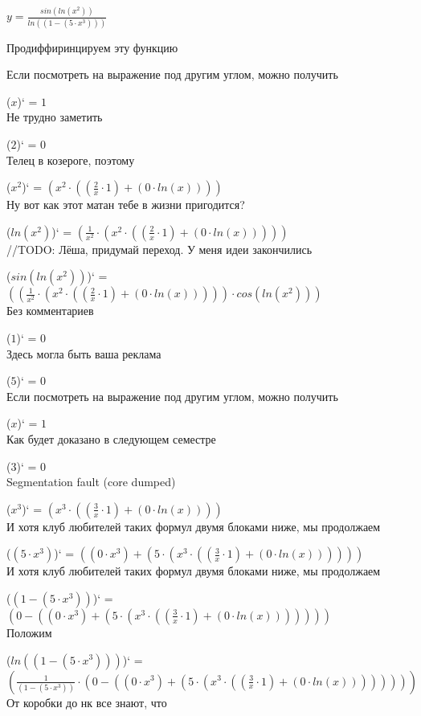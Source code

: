 \documentclass[12pt,a4paper,fleqn]{article}
\begin{document}
$y = $$\frac{sin(ln(x^{2}))}{ln((1 - (5 \cdot x^{3})))}$

 Продиффиринцируем эту функцию

Если посмотреть на выражение под другим углом, можно получить

($x$)` = $1$\\
Не трудно заметить

($2$)` = $0$\\
Телец в козероге, поэтому

($x^{2}$)` = $(x^{2} \cdot ((\frac{2}{x} \cdot 1) + (0 \cdot ln(x))))$\\
Ну вот как этот матан тебе в жизни пригодится?

($ln(x^{2})$)` = $(\frac{1}{x^{2}} \cdot (x^{2} \cdot ((\frac{2}{x} \cdot 1) + (0 \cdot ln(x)))))$\\
//TODO: Лёша, придумай переход. У меня идеи закончились

($sin(ln(x^{2}))$)` = $((\frac{1}{x^{2}} \cdot (x^{2} \cdot ((\frac{2}{x} \cdot 1) + (0 \cdot ln(x))))) \cdot cos(ln(x^{2})))$\\
Без комментариев

($1$)` = $0$\\
Здесь могла быть ваша реклама

($5$)` = $0$\\
Если посмотреть на выражение под другим углом, можно получить

($x$)` = $1$\\
Как будет доказано в следующем семестре

($3$)` = $0$\\
Segmentation fault (core dumped)

($x^{3}$)` = $(x^{3} \cdot ((\frac{3}{x} \cdot 1) + (0 \cdot ln(x))))$\\
И хотя клуб любителей таких формул двумя блоками ниже, мы продолжаем

($(5 \cdot x^{3})$)` = $((0 \cdot x^{3}) + (5 \cdot (x^{3} \cdot ((\frac{3}{x} \cdot 1) + (0 \cdot ln(x))))))$\\
И хотя клуб любителей таких формул двумя блоками ниже, мы продолжаем

($(1 - (5 \cdot x^{3}))$)` = $(0 - ((0 \cdot x^{3}) + (5 \cdot (x^{3} \cdot ((\frac{3}{x} \cdot 1) + (0 \cdot ln(x)))))))$\\
Положим

($ln((1 - (5 \cdot x^{3})))$)` = $(\frac{1}{(1 - (5 \cdot x^{3}))} \cdot (0 - ((0 \cdot x^{3}) + (5 \cdot (x^{3} \cdot ((\frac{3}{x} \cdot 1) + (0 \cdot ln(x))))))))$\\
От коробки до нк все знают, что
\end{document}
